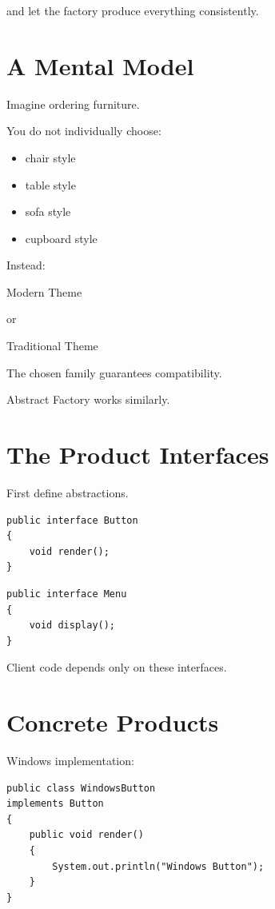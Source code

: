 \documentclass[11pt,a4paper]{book}
\begin{document}
and let the factory produce everything consistently.
\section{A Mental Model}

\begin{mentalmodel}

Imagine ordering furniture.

You do not individually choose:

\begin{itemize}
\item chair style
\item table style
\item sofa style
\item cupboard style
\end{itemize}

Instead:

\begin{center}
Modern Theme
\end{center}

or

\begin{center}
Traditional Theme
\end{center}

The chosen family guarantees compatibility.

Abstract Factory works similarly.

\end{mentalmodel}
\section{The Product Interfaces}

First define abstractions.

\begin{verbatim}
public interface Button
{
    void render();
}
\end{verbatim}

\begin{verbatim}
public interface Menu
{
    void display();
}
\end{verbatim}

Client code depends only on these interfaces.
\section{Concrete Products}

Windows implementation:

\begin{verbatim}
public class WindowsButton
implements Button
{
    public void render()
    {
        System.out.println("Windows Button");
    }
}
\end{verbatim}
\end{document}
